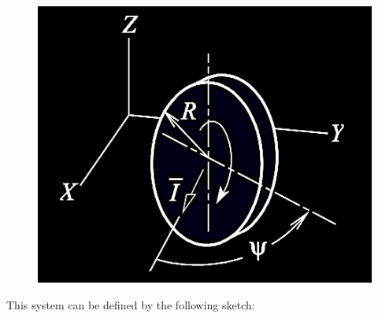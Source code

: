 \documentclass[12pt, letterpaper]{../assignment}
\begin{document}
\begin{figure}[H]
    \centering
    \includegraphics[scale=0.7,frame]{images/Q7_12.png}
\end{figure}

This system can be defined by the following sketch:
\end{document}
